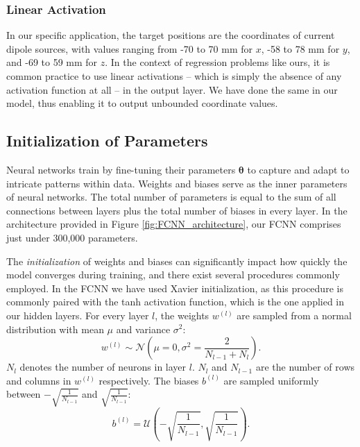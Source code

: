 \documentclass[a4paper, UKenglish, 11pt]{uiomaster}
\begin{document}
\subsubsection{Linear Activation}

In our specific application, the target positions are the coordinates of current dipole sources, with values ranging from -70 to 70 mm for $x$, -58 to 78 mm for $y$, and -69 to 59 mm for $z$.
In the context of regression problems like ours, it is common practice to use linear activations -- which is simply the absence of any activation function at all -- in the output layer. We have done the same in our model, thus enabling it to output unbounded coordinate values.



\subsection{Initialization of Parameters}


Neural networks train by fine-tuning their parameters \(\boldsymbol \theta\) to capture and adapt to intricate patterns within data. Weights and biases serve as the inner parameters of neural networks. The total number of parameters is equal to the sum of all connections between layers plus the total number of biases in every layer. In the architecture provided in Figure \ref{fig:FCNN_architecture}, our FCNN comprises just under 300,000 parameters.

The \emph{initialization} of weights and biases can significantly impact how quickly the model converges during training, and there exist several procedures commonly employed. In the FCNN we have used Xavier initialization, as this procedure is commonly paired with the tanh activation function, which is the one applied in our hidden layers. For every layer $l$, the weights $w^{(l)}$ are sampled from a normal distribution with mean \(\mu\) and variance \(\sigma^2\):
\begin{equation}
  w^{(l)} \sim \mathcal{N} \left( \mu=0, \sigma^2 = \frac{2}{N_{l-1} + N_l} \right).
\end{equation}
\(N_l\) denotes the number of neurons in layer \(l\).
\(N_l\) and \(N_{l - 1}\) are the number of rows and columns in \(w^{(l)}\) respectively.
The biases \(b^{(l)}\) are sampled uniformly between
\(- \sqrt{\frac{1}{N_{l - 1}}}\)
and
\(\sqrt{\frac{1}{N_{l - 1}}}\):
\begin{equation}
  b^{(l)} = \mathcal U \left( - \sqrt{\frac{1}{N_{l - 1}}}, \sqrt{\frac{1}{N_{l - 1}}} \right).
\end{equation}
\end{document}
